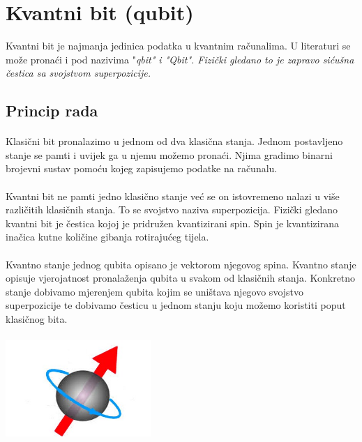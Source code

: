 \documentclass[times, utf8, zavrsni, numeric]{fer}
\begin{document}
\clearpage

\section{Kvantni bit (qubit)}
Kvantni bit je najmanja jedinica podatka u kvantnim računalima. U literaturi se može pronaći i pod nazivima "\it qbit\rm" i "\it Qbit\rm". Fizički gledano to je zapravo sićušna čestica sa svojstvom superpozicije.

\subsection{Princip rada}
\paragraph{}
Klasični bit pronalazimo u jednom od dva klasična stanja. Jednom postavljeno stanje se pamti i uvijek ga u njemu možemo pronaći. Njima gradimo binarni brojevni sustav pomoću kojeg zapisujemo podatke na računalu.

\paragraph{}
Kvantni bit ne pamti jedno klasično stanje već se on istovremeno nalazi u više različitih klasičnih stanja. To se svojstvo naziva superpozicija. Fizički gledano kvantni bit je čestica kojoj je pridružen kvantizirani spin. Spin je kvantizirana inačica kutne količine gibanja rotirajućeg tijela.

\paragraph{}
Kvantno stanje jednog qubita opisano je vektorom njegovog spina. Kvantno stanje opisuje vjerojatnost pronalaženja qubita u svakom od klasičnih stanja. Konkretno stanje dobivamo mjerenjem qubita kojim se uništava njegovo svojstvo superpozicije te dobivamo česticu u jednom stanju koju možemo koristiti poput klasičnog bita.

\begin{center}
\includegraphics[width=55mm, height=40mm]{spin}
\end{center}
\end{document}
